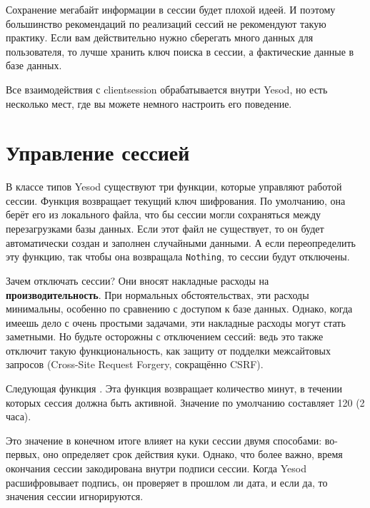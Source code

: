 Сохранение мегабайт информации в сессии будет плохой идеей. И поэтому большинство рекомендаций по реализаций сессий не рекомендуют такую практику. Если вам действительно нужно сберегать много данных для пользователя, то лучше хранить ключ поиска в сессии, а фактические данные в базе данных.

Все взаимодействия с clientsession обрабатывается внутри Yesod, но есть несколько мест, где вы можете немного настроить его поведение.

\section{Управление сессией}

В классе типов Yesod существуют три функции, которые управляют работой сессии. Функция  возвращает текущий ключ шифрования. По умолчанию, она берёт его из локального файла, что бы сессии могли сохраняться между перезагрузками базы данных. Если этот файл не существует, то он будет автоматически создан и заполнен случайными данными. А если переопределить эту функцию, так чтобы она возвращала \lstinline'Nothing', то сессии будут отключены.

\begin{remark}
Зачем отключать сессии? Они вносят накладные расходы на \textbf{производительность}. При нормальных обстоятельствах, эти расходы минимальны, особенно по сравнению с доступом к базе данных. Однако, когда имеешь дело с очень простыми задачами, эти накладные расходы могут стать заметными. Но будьте осторожны с отключением сессий: ведь это также отключит такую функциональность, как защиту от подделки межсайтовых запросов (Cross-Site Request Forgery, сокращённо CSRF).
\end{remark}

Следующая функция . Эта функция возвращает количество минут, в течении которых сессия должна быть активной. Значение по умолчанию составляет 120 (2 часа).

Это значение в конечном итоге влияет на куки сессии двумя способами: во-первых, оно определяет срок действия куки. Однако, что более важно, время окончания сессии закодирована внутри подписи сессии. Когда Yesod расшифровывает подпись, он проверяет в прошлом ли дата, и если да, то значения сессии игнорируются.

